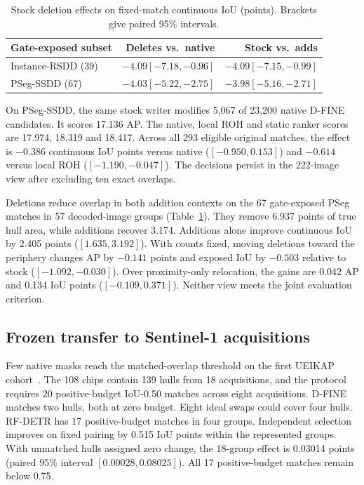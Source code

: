 \documentclass[journal]{IEEEtran}
\begin{document}
\begin{table}[t]
\centering
\caption{Stock deletion effects on fixed-match continuous IoU (points). Brackets give paired 95\% intervals.}
\label{tab:stock-deletions}
\footnotesize
\setlength{\tabcolsep}{3pt}
\begin{tabular}{@{}lrr@{}}
\toprule
Gate-exposed subset & Deletes vs.\ native & Stock vs.\ adds \\
\midrule
Instance-RSDD (39) & \(-4.09[-7.18,-0.96]\) & \(-4.09[-7.15,-0.99]\) \\
PSeg-SSDD (67) & \(-4.03[-5.22,-2.75]\) & \(-3.98[-5.16,-2.71]\) \\
\bottomrule
\end{tabular}
\end{table}

On PSeg-SSDD, the same stock writer modifies 5,067 of 23,200 native D-FINE candidates. It scores 17.136 AP. The native, local ROH and static ranker scores are 17.974, 18.319 and 18.417. Across all 293 eligible original matches, the effect is \(-0.386\) continuous IoU points versus native (\([-0.950,0.153]\)) and \(-0.614\) versus local ROH (\([-1.190,-0.047]\)). The decisions persist in the 222-image view after excluding ten exact overlaps.

Deletions reduce overlap in both addition contexts on the 67 gate-exposed PSeg matches in 57 decoded-image groups (Table~\ref{tab:stock-deletions}). They remove 6.937 points of true hull area, while additions recover 3.174. Additions alone improve continuous IoU by 2.405 points (\([1.635,3.192]\)). With counts fixed, moving deletions toward the periphery changes AP by \(-0.141\) points and exposed IoU by \(-0.503\) relative to stock (\([-1.092,-0.030]\)). Over proximity-only relocation, the gains are 0.042 AP and 0.134 IoU points (\([-0.109,0.371]\)). Neither view meets the joint evaluation criterion.

\subsection{Frozen transfer to Sentinel-1 acquisitions}
Few native masks reach the matched-overlap threshold on the first UEIKAP cohort~\cite{ueikap}. The 108 chips contain 139 hulls from 18 acquisitions, and the protocol requires 20 positive-budget IoU-0.50 matches across eight acquisitions. D-FINE matches two hulls, both at zero budget. Eight ideal swaps could cover four hulls. RF-DETR has 17 positive-budget matches in four groups. Independent selection improves on fixed pairing by 0.515 IoU points within the represented groups. With unmatched hulls assigned zero change, the 18-group effect is 0.03014 points (paired 95\% interval \([0.00028,0.08025]\)). All 17 positive-budget matches remain below 0.75.
\end{document}
